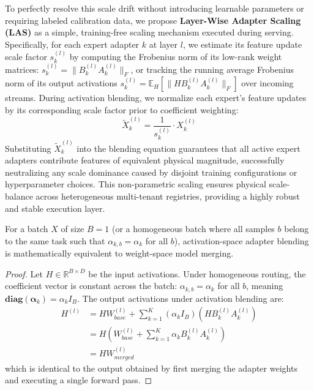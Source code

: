 To perfectly resolve this scale drift without introducing learnable parameters or requiring labeled calibration data, we propose \textbf{Layer-Wise Adapter Scaling (LAS)} as a simple, training-free scaling mechanism executed during serving. Specifically, for each expert adapter $k$ at layer $l$, we estimate its feature update scale factor $s_k^{(l)}$ by computing the Frobenius norm of its low-rank weight matrices: $s_k^{(l)} = \|B_k^{(l)} A_k^{(l)}\|_F$, or tracking the running average Frobenius norm of its output activations $s_k^{(l)} = \mathbb{E}_H [ \|H B_k^{(l)} A_k^{(l)}\|_F ]$ over incoming streams. During activation blending, we normalize each expert's feature updates by its corresponding scale factor prior to coefficient weighting:
\begin{equation}
  \tilde{X}_k^{(l)} = \frac{1}{s_k^{(l)}} \cdot X_k^{(l)}
\end{equation}
Substituting $\tilde{X}_k^{(l)}$ into the blending equation guarantees that all active expert adapters contribute features of equivalent physical magnitude, successfully neutralizing any scale dominance caused by disjoint training configurations or hyperparameter choices. This non-parametric scaling ensures physical scale-balance across heterogeneous multi-tenant registries, providing a highly robust and stable execution layer.

\begin{proposition}
  For a batch $X$ of size $B=1$ (or a homogeneous batch where all samples $b$ belong to the same task such that $\alpha_{k, b} = \alpha_k$ for all $b$), activation-space adapter blending is mathematically equivalent to weight-space model merging.
\end{proposition}
\begin{proof}
  Let $H \in \mathbb{R}^{B \times D}$ be the input activations. Under homogeneous routing, the coefficient vector is constant across the batch: $\alpha_{k, b} = \alpha_k$ for all $b$, meaning $\mathbf{diag}(\boldsymbol{\alpha}_k) = \alpha_k I_B$.
  The output activations under activation blending are:
  \begin{align*}
    H^{(l)} &= H W_{base}^{(l)} + \sum_{k=1}^K (\alpha_k I_B) \left( H B_k^{(l)} A_k^{(l)} \right) \\
    &= H \left( W_{base}^{(l)} + \sum_{k=1}^K \alpha_k B_k^{(l)} A_k^{(l)} \right) \\
    &= H W^{(l)}_{merged}
  \end{align*}
  which is identical to the output obtained by first merging the adapter weights and executing a single forward pass.
\end{proof}

